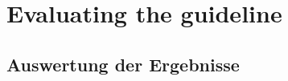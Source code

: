 \documentclass[a4paper,twoside,11pt, pagesize]{scrartcl}
\begin{document}
\section{Evaluating the guideline}

\subsection{Auswertung der Ergebnisse}
\end{document}
